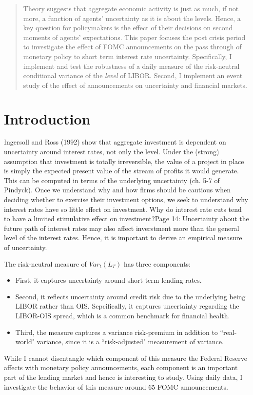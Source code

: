 \documentclass[11pt]{article}
\begin{document}
\maketitle

\begin{abstract}
 Theory suggests that aggregate economic activity is just as much, if not more, a function of agents' uncertainty as it is about the levels. Hence, a key question for policymakers is the effect of their decisions on second moments of agents' expectations. This paper focuses the post crisis period to investigate the effect of FOMC announcements on the pass through of monetary policy  to short term interest rate uncertainty. Specifically, I implement and test the robustness of a daily measure of the risk-neutral conditional variance of the \textit{level} of LIBOR. Second, I implement an event study of the effect of announcements on uncertainty and financial markets. 
\end{abstract}

\section{Introduction}
Ingersoll and Ross (1992)  show that aggregate investment is dependent on uncertainty around interest rates, not only the level. Under the (strong) assumption that investment is totally irreversible, the value of a project in place is simply the expected present value of the stream of profits it would generate. This can be computed in terms of the underlying uncertainty (ch. 5-7 of Pindyck). Once we understand why and how firms should be cautious when deciding whether to exercise their investment options, we seek to understand why interest rates have so little effect on investment. Why do interest rate cuts tend to have a limited stimulative effect on investment?Page 14: Uncertainty about the future path of interest rates may also affect inverstment more than the general level of the interest rates. Hence, it is important to derive an empirical measure of uncertainty. 

The risk-neutral measure of $Var_{t}(L_{T})$ has three components:
\begin{itemize}
	\item First, it captures uncertainty around short term lending rates. 
	\item Second, it reflects uncertainty around credit risk due to the underlying being LIBOR rather than OIS. Sepcifically, it captures uncertainty regarding the LIBOR-OIS spread, which is a common benchmark for financial health.  
	\item Third, the measure captures a variance risk-premium in addition to ``real-world" variance, since it is a ``risk-adjusted" measurement of variance. 
\end{itemize}
While I cannot disentangle which component of this measure the Federal Reserve affects with monetary policy announcements, each component is an important part of the lending market and hence is interesting to study.  Using daily data, I investigate the behavior of this measure around 65 FOMC announcements.  
\end{document}
